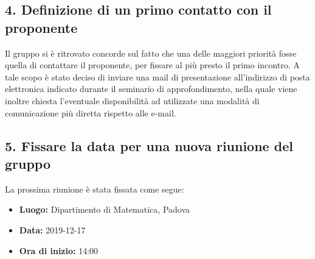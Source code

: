 \subsection*{4. Definizione di un primo contatto con il proponente}

Il gruppo si è ritrovato concorde sul fatto che una delle maggiori priorità fosse quella di contattare il proponente, per fissare al più presto il primo incontro.
A tale scopo è stato deciso di inviare una mail di presentazione all'indirizzo di posta elettronica indicato durante il seminario di approfondimento, nella quale viene inoltre chiesta l'eventuale disponibilità ad utilizzate una modalità di comunicazione più diretta rispetto alle e-mail.

\subsection*{5. Fissare la data per una nuova riunione del gruppo}

La prossima riunione è stata fissata come segue:
\begin{itemize}
	\item \textbf{Luogo:} Dipartimento di Matematica, Padova
	\item \textbf{Data:} 2019-12-17
	\item \textbf{Ora di inizio:} 14:00
\end{itemize}